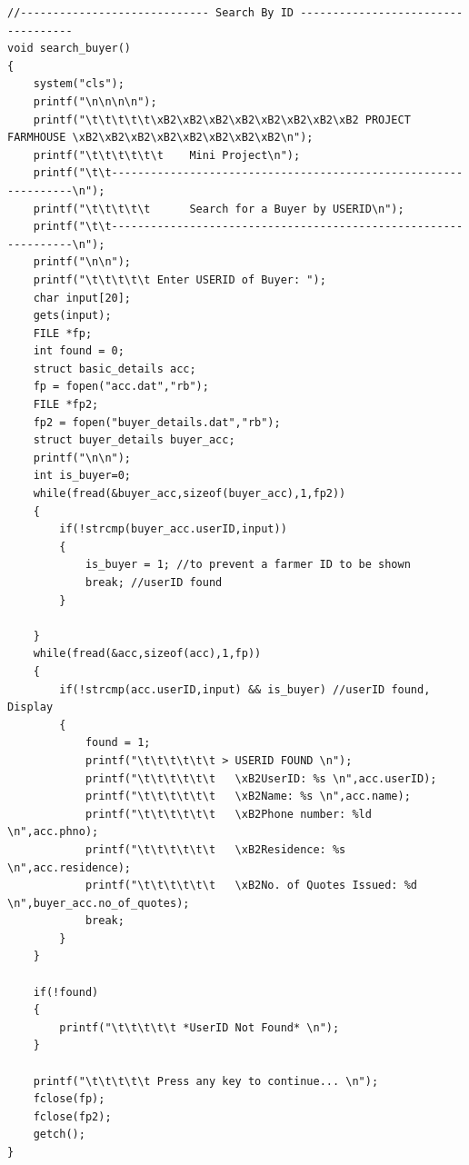 \documentclass[12pt]{article}
\begin{document}
\begin{lstlisting}
//----------------------------- Search By ID -----------------------------------
void search_buyer()
{
    system("cls");
    printf("\n\n\n\n");
    printf("\t\t\t\t\t\xB2\xB2\xB2\xB2\xB2\xB2\xB2\xB2 PROJECT FARMHOUSE \xB2\xB2\xB2\xB2\xB2\xB2\xB2\xB2\n");
    printf("\t\t\t\t\t\t    Mini Project\n");
    printf("\t\t----------------------------------------------------------------\n");
    printf("\t\t\t\t\t      Search for a Buyer by USERID\n");
    printf("\t\t----------------------------------------------------------------\n");
    printf("\n\n");
    printf("\t\t\t\t\t Enter USERID of Buyer: ");
    char input[20];
    gets(input);
    FILE *fp;
    int found = 0;
    struct basic_details acc;
    fp = fopen("acc.dat","rb");
    FILE *fp2;
    fp2 = fopen("buyer_details.dat","rb");
    struct buyer_details buyer_acc;
    printf("\n\n");
    int is_buyer=0;
    while(fread(&buyer_acc,sizeof(buyer_acc),1,fp2))
    {
        if(!strcmp(buyer_acc.userID,input))
        {
            is_buyer = 1; //to prevent a farmer ID to be shown
            break; //userID found
        }

    }
    while(fread(&acc,sizeof(acc),1,fp))
    {
        if(!strcmp(acc.userID,input) && is_buyer) //userID found, Display
        {
            found = 1;
            printf("\t\t\t\t\t\t > USERID FOUND \n");
            printf("\t\t\t\t\t\t   \xB2UserID: %s \n",acc.userID);
            printf("\t\t\t\t\t\t   \xB2Name: %s \n",acc.name);
            printf("\t\t\t\t\t\t   \xB2Phone number: %ld \n",acc.phno);
            printf("\t\t\t\t\t\t   \xB2Residence: %s \n",acc.residence);
            printf("\t\t\t\t\t\t   \xB2No. of Quotes Issued: %d \n",buyer_acc.no_of_quotes);
            break;
        }
    }

    if(!found)
    {
        printf("\t\t\t\t\t *UserID Not Found* \n");
    }

    printf("\t\t\t\t\t Press any key to continue... \n");
    fclose(fp);
    fclose(fp2);
    getch();
}



\end{lstlisting}
\end{document}

